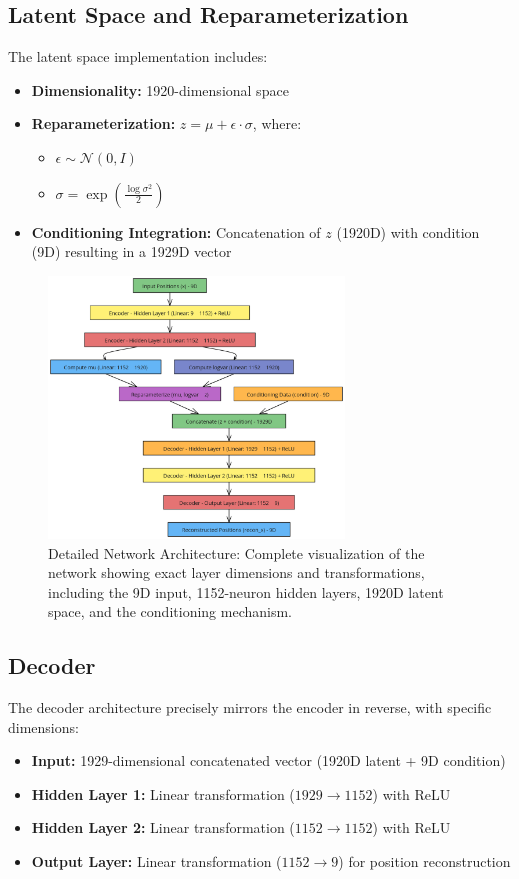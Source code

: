 \documentclass{article}
\begin{document}
\subsection{Latent Space and Reparameterization}
The latent space implementation includes:
\begin{itemize}
    \item \textbf{Dimensionality:} 1920-dimensional space
    \item \textbf{Reparameterization:} $z = \mu + \epsilon \cdot \sigma$, where:
    \begin{itemize}
        \item $\epsilon \sim \mathcal{N}(0, I)$
        \item $\sigma = \exp\left(\frac{\log\sigma^2}{2}\right)$
    \end{itemize}
    \item \textbf{Conditioning Integration:} Concatenation of $z$ (1920D) with condition (9D) resulting in a 1929D vector
\end{itemize}

\begin{figure}[H]
    \centering
    \includegraphics[width=0.7\textwidth]{3.png}
    \caption{Detailed Network Architecture: Complete visualization of the network showing exact layer dimensions and transformations, including the 9D input, 1152-neuron hidden layers, 1920D latent space, and the conditioning mechanism.}
    \label{fig:detailed_architecture}
\end{figure}

\subsection{Decoder}
The decoder architecture precisely mirrors the encoder in reverse, with specific dimensions:
\begin{itemize}
    \item \textbf{Input:} 1929-dimensional concatenated vector (1920D latent + 9D condition)
    \item \textbf{Hidden Layer 1:} Linear transformation ($1929 \rightarrow 1152$) with ReLU
    \item \textbf{Hidden Layer 2:} Linear transformation ($1152 \rightarrow 1152$) with ReLU
    \item \textbf{Output Layer:} Linear transformation ($1152 \rightarrow 9$) for position reconstruction
\end{itemize}
\end{document}
